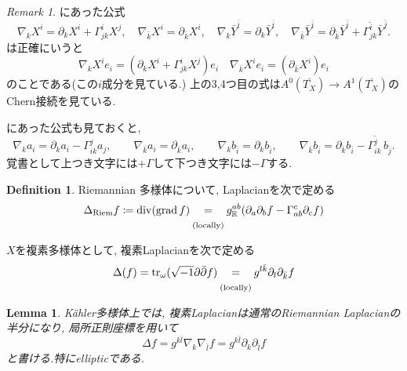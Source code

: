 \documentclass[dvipdfmx,a4paper,11pt]{article} %
\newtheorem{lem}[thm]{Lemma}
\theoremstyle{definition}
\newtheorem{defn}[thm]{Definition}
\theoremstyle{remark}
\newtheorem{rem}[thm]{Remark}
\numberwithin{equation}{section}
\newcommand{\underalign}[2]{%
  \quad
  \underset{\mathclap{\raisebox{-1.6ex}{\ensuremath{\scriptstyle #1}}}}{#2}
  \quad
}
\newcommand{\R}{\mathbb{R}}
\begin{document}
\begin{rem}
\label{rem-BG13-formula}
\cite[(3.6)]{BG13}にあった公式
\begin{equation*}
\nabla_k X^i
=
\partial_k X^i+\Gamma^i_{jk}X^j,
\quad
\nabla_{\bar{k}}X^i
=
\partial_{\bar{k}}X^i,
\quad
\nabla_k \bar{Y}^{\bar{i}}
=
\partial_k \bar{Y}^{\bar{i}},
\quad
\nabla_{\bar{k}}\bar{Y}^{\bar{i}}
=
\partial_{\bar{k}}\bar{Y}^{\bar{i}}
+
\overline{\Gamma^i_{jk}}\bar{Y}^{\bar{j}}.
\end{equation*}
は正確にいうと
\[
\nabla_k X^i e_i
=
\left(\partial_k X^i+\Gamma^i_{jk}X^j\right)e_i
\quad
\nabla_{\bar{k}}X^i e_i
=
\left(\partial_{\bar{k}}X^i\right)e_i
\]
のことである(この$i$成分を見ている.) 上の3,4つ目の式は$A^0(\overline{T_X}) \to A^1(\overline{T_X})$のChern接続を見ている.

\cite[(3.7)]{BG13}にあった公式も見ておくと, 
\[
\nabla_k a_i=\partial_k a_i-\Gamma^j_{ik}a_j,\qquad
\nabla_{\bar k}a_i=\partial_{\bar k}a_i,\qquad
\nabla_k b_{\bar i}=\partial_k b_{\bar i},\qquad
\nabla_{\bar k}b_{\bar i}
=\partial_{\bar k}b_{\bar i}
-\overline{\Gamma^j_{ik}}\,b_{\bar j}.
\]
覚書として上つき文字には$+\Gamma$して下つき文字には$-\Gamma$する. 
\end{rem}

\begin{defn}
\label{defn-cpx-Laplace}
Riemannian 多様体について, Laplacianを次で定める
\[
\Delta_{\mathrm{Riem}} f
\coloneqq  \operatorname{div}(\operatorname{grad} f)
\underalign{\text{(locally)}}{=}
g^{ab}_{\R}(\partial_a \partial_b f -\Gamma_{ab}^c \partial_c f)
\]


$X$を複素多様体として, 複素Laplacianを次で定める
\[
\Delta(f)
=
\operatorname{tr}_\omega(\sqrt{-1} \partial \bar\partial f)
\underalign{\text{(locally)}}{=}
g^{l\bar{k}}\partial_l \partial_{\bar k} f
\]
\end{defn}

\begin{lem}
\label{lem-cpx-Laplace}
K\"ahler多様体上では, 複素Laplacianは通常のRiemannian Laplacianの半分になり, 
局所正則座標を用いて
\[
\Delta f = g^{k\bar l}\nabla_k\nabla_{\bar l}f = g^{k\bar l}\partial_k\partial_{\bar l}f
\]
と書ける.特にellipticである. 
\end{lem}
\end{document}
